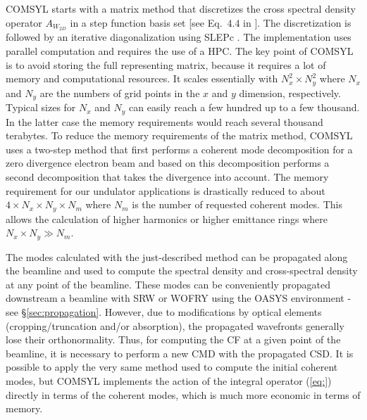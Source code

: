 \documentclass{iucr}              %
\newcommand{\inred}[1]{{\color{red}#1}}
\begin{document}
 
COMSYL starts with a matrix method that discretizes the cross spectral density operator $A_{W_{2D}}$ in a step function basis set [see Eq.~4.4 in \cite{glassThesis}]. The discretization is followed by an iterative diagonalization using SLEPc \cite{SLEPc}. The implementation uses parallel computation and requires the use of a HPC. The key point of COMSYL is to avoid storing the full representing matrix, because it requires a lot of memory and computational resources. It scales essentially with $N_x^2 \times N_y^2$ where $N_x$ and $N_y$ are the numbers of grid points in the $x$ and $y$ dimension, respectively. Typical sizes for $N_x$ and $N_y$ can easily reach a few hundred up to a few thousand. In the latter case the memory requirements would reach several thousand terabytes. To reduce the memory requirements of the matrix method, COMSYL uses a two-step method that first performs a coherent mode decomposition for a zero divergence electron beam and based on this decomposition performs a second decomposition that takes the divergence into account. The memory requirement for our undulator applications is drastically reduced to about $4 \times N_x \times N_y \times N_m$ where $N_m$ is the number of requested coherent modes. This allows the calculation of higher harmonics or higher emittance rings where $N_x \times N_y \gg N_m$. 

The modes calculated with the just-described method can be propagated along the beamline and used to compute the spectral density and cross-spectral density at any point of the beamline. These modes can be conveniently propagated downstream a beamline with SRW or WOFRY using the OASYS environment - see \S\ref{sec:propagation}. However, due to modifications by optical elements (cropping/truncation and/or absorption), the propagated wavefronts generally lose their orthonormality. Thus, for computing the CF at a given point of the beamline, it is necessary to perform a new CMD with the propagated CSD. It is possible to apply the very same method used to compute the initial coherent modes, but COMSYL implements the action of the integral operator \inred{(\ref{eq:})} directly in terms of the coherent modes, which is much more economic in terms of memory.

\end{document}
